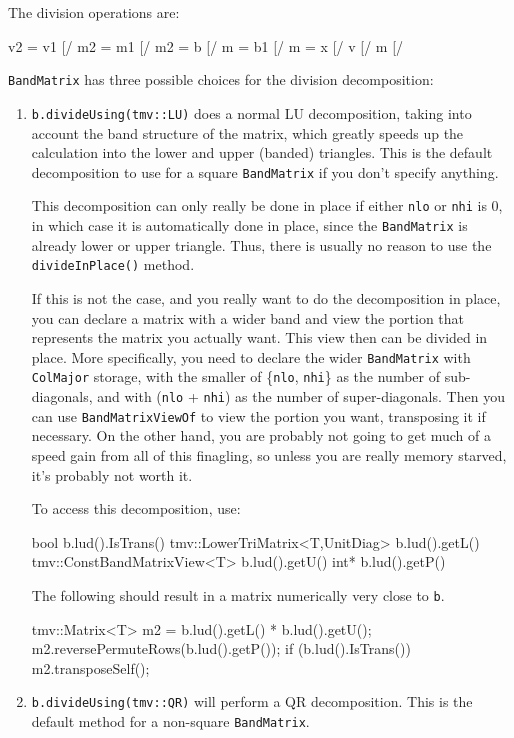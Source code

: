 \documentclass[twoside,letterpaper,11pt]{article}
\renewcommand{\tt}[1]{{\lstinline {#1}}}
\begin{document}
The division operations are:
\begin{tmvcode}
v2 = v1 [/%
m2 = m1 [/%
m2 = b [/%
m = b1 [/%
m = x [/%
v [/%
m [/%
\end{tmvcode}
\tt{BandMatrix} has three possible choices for the division decomposition:
\begin{enumerate}
\item
\tt{b.divideUsing(tmv::LU)} does a normal LU decomposition,
taking into account the band structure of the matrix, which greatly speeds up 
the calculation into the lower and upper (banded) triangles.
This is the default decomposition to use for a square \tt{BandMatrix} 
if you don't specify anything.

This decomposition can only really
be done in place if either \tt{nlo} or \tt{nhi} is 0,
in which case it is automatically done in place,
since the \tt{BandMatrix} is already lower or upper triangle.
Thus, there is usually no reason to use the \tt{divideInPlace()} method.

If this is not the case, and you really want to do the decomposition in place, you can
declare a matrix with a wider band and view the portion that represents the matrix
you actually want.  This view then can be divided in place.  More specifically,
you need to declare the wider \tt{BandMatrix} with \tt{ColMajor} storage,
with the smaller of
\{\tt{nlo}, \tt{nhi}\} as the number of sub-diagonals, and with 
(\tt{nlo} + \tt{nhi}) as the number of super-diagonals.  
Then you can use \tt{BandMatrixViewOf} to view the portion you want, transposing it if
necessary.  On the other hand, you are probably not going to get much of a speed gain 
from all of this finagling, so unless you are really memory starved, it's probably not worth it.

To access this decomposition, use:
\begin{tmvcode}
bool b.lud().IsTrans()
tmv::LowerTriMatrix<T,UnitDiag> b.lud().getL()
tmv::ConstBandMatrixView<T> b.lud().getU()
int* b.lud().getP()
\end{tmvcode}
The following should result in a matrix numerically very close to \tt{b}.
\begin{tmvcode}
tmv::Matrix<T> m2 = b.lud().getL() * b.lud().getU();
m2.reversePermuteRows(b.lud().getP());
if (b.lud().IsTrans()) m2.transposeSelf();
\end{tmvcode}

\item
\tt{b.divideUsing(tmv::QR)} will perform a QR decomposition.  
This is the default method for a non-square \tt{BandMatrix}.


\end{enumerate}
\end{document}
